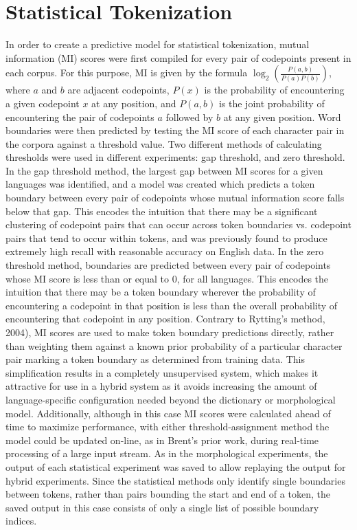 \section{Statistical Tokenization}
In order to create a predictive model for statistical tokenization, mutual information (MI) scores were first compiled for every pair of codepoints present in each corpus. For this purpose, MI is given by the formula $\log_2(\frac{P(a,b)}{P(a)P(b)})$, where $a$ and $b$ are adjacent codepoints, $P(x)$ is the probability of encountering a given codepoint $x$ at any position, and $P(a,b)$ is the joint probability of encountering the pair of codepoints $a$ followed by $b$ at any given position. Word boundaries were then predicted by testing the MI score of each character pair in the corpora against a threshold value.
Two different methods of calculating thresholds were used in different experiments: gap threshold, and zero threshold. In the gap threshold method, the largest gap between MI scores for a given languages was identified, and a model was created which predicts a token boundary between every pair of codepoints whose mutual information score falls below that gap. This encodes the intuition that there may be a significant clustering of codepoint pairs that can occur across token boundaries vs. codepoint pairs that tend to occur within tokens, and was previously found to produce extremely high recall with reasonable accuracy on English data\cite{kearsley14}. In the zero threshold method, boundaries are predicted between every pair of codepoints whose MI score is less than or equal to 0, for all languages. This encodes the intuition that there may be a token boundary wherever the probability of encountering a codepoint in that position is less than the overall probability of encountering that codepoint in any position.
Contrary to Rytting's method\cite{rytting04}, 2004), MI scores are used to make token boundary predictions directly, rather than weighting them against a known prior probability of a particular character pair marking a token boundary as determined from training data. This simplification results in a completely unsupervised system, which makes it attractive for use in a hybrid system as it avoids increasing the amount of language-specific configuration needed beyond the dictionary or morphological model. Additionally, although in this case MI scores were calculated ahead of time to maximize performance, with either threshold-assignment method the model could be updated on-line, as in Brent's prior work\cite{brent99}, during real-time processing of a large input stream.
As in the morphological experiments, the output of each statistical experiment was saved to allow replaying the output for hybrid experiments. Since the statistical methods only identify single boundaries between tokens, rather than pairs bounding the start and end of a token, the saved output in this case consists of only a single list of possible boundary indices.

